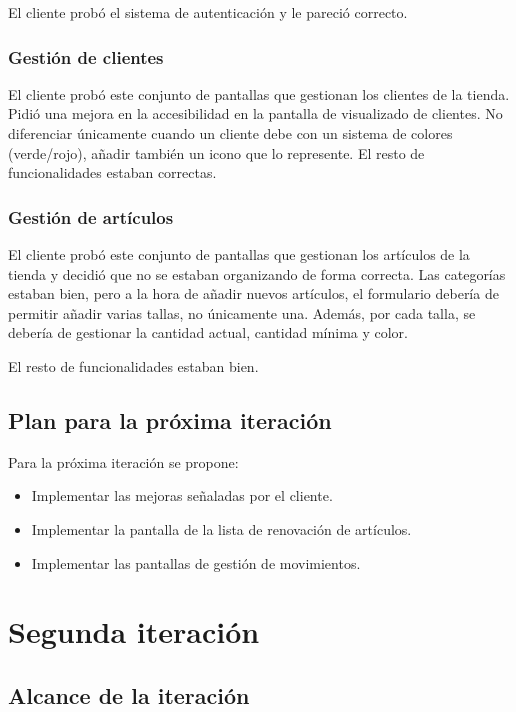 El cliente probó el sistema de autenticación y le pareció correcto. 

\subsubsection{Gestión de clientes}

El cliente probó este conjunto de pantallas que gestionan los clientes de la tienda. Pidió una mejora en la accesibilidad en la pantalla de visualizado de clientes. No diferenciar únicamente cuando un cliente debe con un sistema de colores (verde/rojo), añadir también un icono que lo represente. El resto de funcionalidades estaban correctas. 

\subsubsection{Gestión de artículos}

El cliente probó este conjunto de pantallas que gestionan los artículos de la tienda y decidió que no se estaban organizando de forma correcta. Las categorías estaban bien, pero a la hora de añadir nuevos artículos, el formulario debería de permitir añadir varias tallas, no únicamente una. Además, por cada talla, se debería de gestionar la cantidad actual, cantidad mínima y color. 

El resto de funcionalidades estaban bien.  


\subsection{Plan para la próxima iteración}

Para la próxima iteración se propone:

\begin{itemize}
	\item Implementar las mejoras señaladas por el cliente.
	\item Implementar la pantalla de la lista de renovación de artículos.
	\item Implementar las pantallas de gestión de movimientos.
\end{itemize}

\section{Segunda iteración}

\subsection{Alcance de la iteración}

